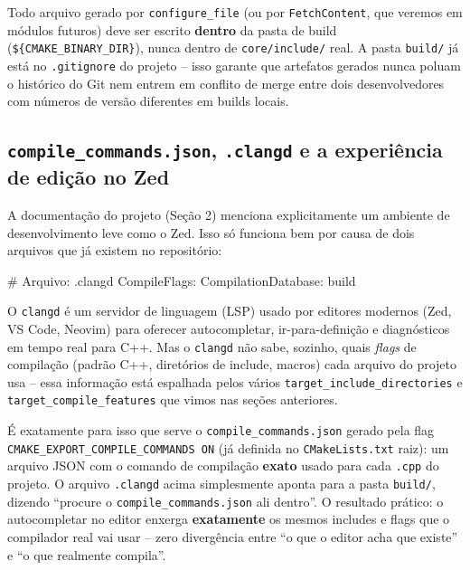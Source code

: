 \begin{CaixaAlerta}
Todo arquivo gerado por \texttt{configure\_file} (ou por \texttt{FetchContent}, que veremos em módulos futuros) deve ser escrito \textbf{dentro} da pasta de build (\texttt{\$\{CMAKE\_BINARY\_DIR\}}), nunca dentro de \texttt{core/include/} real. A pasta \texttt{build/} já está no \texttt{.gitignore} do projeto -- isso garante que artefatos gerados nunca poluam o histórico do Git nem entrem em conflito de merge entre dois desenvolvedores com números de versão diferentes em builds locais.
\end{CaixaAlerta}

\subsection{\texttt{compile\_commands.json}, \texttt{.clangd} e a experiência de edição no Zed}
\label{sec:clangd}

A documentação do projeto (Seção 2) menciona explicitamente um ambiente de desenvolvimento leve como o Zed. Isso só funciona bem por causa de dois arquivos que já existem no repositório:

\begin{CaixaCodigo}
# Arquivo: .clangd
CompileFlags:
  CompilationDatabase: build
\end{CaixaCodigo}

O \texttt{clangd} é um servidor de linguagem (LSP) usado por editores modernos (Zed, VS Code, Neovim) para oferecer autocompletar, ir-para-definição e diagnósticos em tempo real para C++. Mas o \texttt{clangd} não sabe, sozinho, quais \textit{flags} de compilação (padrão C++, diretórios de include, macros) cada arquivo do projeto usa -- essa informação está espalhada pelos vários \texttt{target\_include\_directories} e \texttt{target\_compile\_features} que vimos nas seções anteriores.

É exatamente para isso que serve o \texttt{compile\_commands.json} gerado pela flag \texttt{CMAKE\_EXPORT\_COMPILE\_COMMANDS ON} (já definida no \texttt{CMakeLists.txt} raiz): um arquivo JSON com o comando de compilação \textbf{exato} usado para cada \texttt{.cpp} do projeto. O arquivo \texttt{.clangd} acima simplesmente aponta para a pasta \texttt{build/}, dizendo ``procure o \texttt{compile\_commands.json} ali dentro''. O resultado prático: o autocompletar no editor enxerga \textbf{exatamente} os mesmos includes e flags que o compilador real vai usar -- zero divergência entre ``o que o editor acha que existe'' e ``o que realmente compila''.

